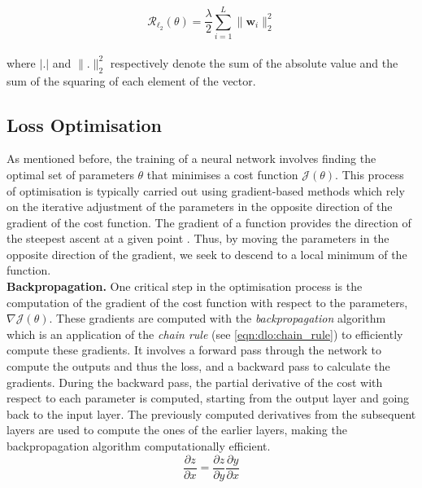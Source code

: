 \begin{equation}
  \label{eqn:dlo:reg_l2}
  \mathcal{R}_{\ell_2}(\theta) = \frac{\lambda}{2} \displaystyle \sum_{i=1}^{L} \| \mathbf{w}_i \|_2^2 
\end{equation}\\

\noindent where $\left|. \right|$ and $\|.\|_2^2$ respectively denote the sum of
the absolute value and the sum of the squaring of each element of the vector.\\

\subsection{Loss Optimisation}\label{sec:dlo:backpropagation}

As mentioned before, the training of a neural network involves finding the
optimal set of parameters $\theta$ that minimises a cost function
$\mathcal{J}(\theta)$. This process of optimisation is typically carried out
using gradient-based methods which rely on the iterative adjustment of the
parameters in the opposite direction of the gradient of the cost function. The
gradient of a function provides the direction of the steepest ascent at a given
point \cite{boyd2004convex}. Thus, by moving the parameters in the opposite
direction of the gradient, we seek to descend to a local minimum of the
function.\\

\noindent \textbf{Backpropagation.} One critical step in the optimisation
process is the computation of the gradient of the cost function with respect to
the parameters, $\nabla \mathcal{J}(\theta)$. These gradients are computed with
the \emph{backpropagation} algorithm \cite{rumelhart1986learning} which is an
application of the \emph{chain rule} (see \cref{eqn:dlo:chain_rule}) to
efficiently compute these gradients. It involves a forward pass through the
network to compute the outputs and thus the loss, and a backward pass to
calculate the gradients. During the backward pass, the partial derivative of the
cost with respect to each parameter is computed, starting from the output layer
and going back to the input layer. The previously computed derivatives from the
subsequent layers are used to compute the ones of the earlier layers,  
making the backpropagation algorithm computationally efficient.\\

\begin{equation}
  \label{eqn:dlo:chain_rule}
  \frac{\partial z}{\partial x} = \frac{\partial z}{\partial y} \frac{\partial y}{\partial x}
\end{equation}\\

